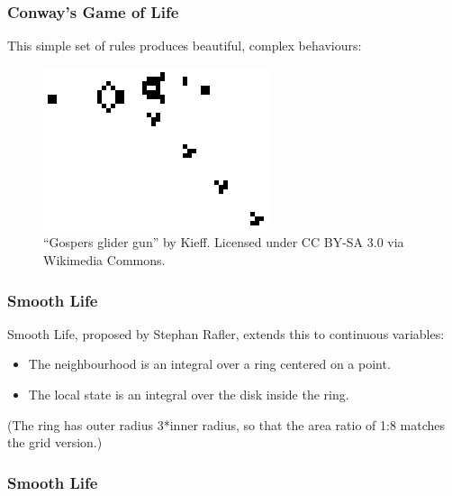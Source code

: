\subsubsection{Conway's Game of Life}\label{conways-game-of-life-1}

This simple set of rules produces beautiful, complex behaviours:

\begin{figure}[htbp]
\centering
\includegraphics{07MPIExample/figures/gun.png}
\caption{``Gospers glider gun'' by Kieff. Licensed under CC BY-SA 3.0
via Wikimedia Commons.}
\end{figure}

\subsubsection{Smooth Life}\label{smooth-life-1}

Smooth Life, proposed by Stephan Rafler, extends this to continuous
variables:

\begin{itemize}
\itemsep1pt\parskip0pt
\item
  The neighbourhood is an integral over a ring centered on a point.
\item
  The local state is an integral over the disk inside the ring.
\end{itemize}

(The ring has outer radius 3*inner radius, so that the area ratio of 1:8
matches the grid version.)

\subsubsection{Smooth Life}\label{smooth-life-2}

